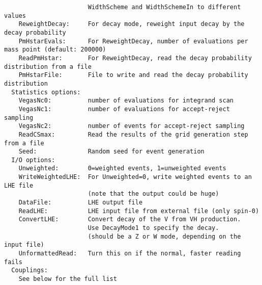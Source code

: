 \documentclass[aps,superscriptaddress,nofootinbib]{revtex4}
\begin{document}
\begin{verbatim}
                       WidthScheme and WidthSchemeIn to different values
    ReweightDecay:     For decay mode, reweight input decay by the decay probability
    PmHstarEvals:      For ReweightDecay, number of evaluations per mass point (default: 200000)
    ReadPmHstar:       For ReweightDecay, read the decay probability distribution from a file
    PmHstarFile:       File to write and read the decay probability distribution
  Statistics options:
    VegasNc0:          number of evaluations for integrand scan
    VegasNc1:          number of evaluations for accept-reject sampling
    VegasNc2:          number of events for accept-reject sampling
    ReadCSmax:         Read the results of the grid generation step from a file
    Seed:              Random seed for event generation
  I/O options:
    Unweighted:        0=weighted events, 1=unweighted events
    WriteWeightedLHE:  For Unweighted=0, write weighted events to an LHE file
                       (note that the output could be huge)
    DataFile:          LHE output file
    ReadLHE:           LHE input file from external file (only spin-0)
    ConvertLHE:        Convert decay of the V from VH production.
                       Use DecayMode1 to specify the decay.
                       (should be a Z or W mode, depending on the input file)
    UnformattedRead:   Turn this on if the normal, faster reading fails
  Couplings:
    See below for the full list
\end{verbatim}
\end{document}
